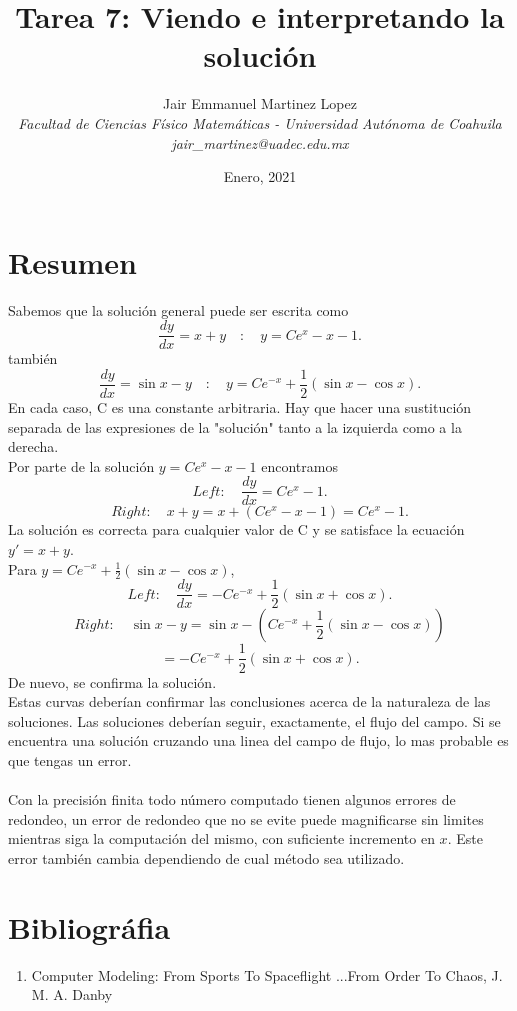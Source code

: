 \documentclass[12pt]{article}
\title{\vspace{-10mm}\fontsize{16pt}{10pt}\textbf{Tarea 7: Viendo e interpretando la solución}} %
\author{
	\normalsize Jair Emmanuel Martinez Lopez\\ %
	\textit{\normalsize Facultad de Ciencias Físico Matemáticas - Universidad Autónoma de Coahuila}\\ %
	\textit{\normalsize jair\_{}martinez@uadec.edu.mx} %
}
\date{\normalsize Enero, 2021} %
\begin{document}
\maketitle
\thispagestyle{fancy}
\section*{Resumen}
Sabemos que la solución general puede ser escrita como
$$
\dfrac{dy}{dx}=x+y \quad :\quad y=Ce^{x}-x-1.
$$
también 
$$
\dfrac{dy}{dx}=\sin{x-y}\quad :\quad y=Ce^{-x}+\frac{1}{2}(\sin{x}-\cos{x}).
$$
En cada caso, C es una constante arbitraria. Hay que hacer una sustitución separada de las expresiones de la "solución" tanto a la izquierda como a la derecha.\\
Por parte de la solución $y=Ce^{x}-x-1$ encontramos
$$
Left: \quad \dfrac{dy}{dx}=Ce^{x}-1.
$$
$$
Right: \quad x+y=x+(Ce^{x}-x-1)=Ce^{x}-1.
$$
La solución es correcta para cualquier valor de C y se satisface la ecuación $y'=x+y$.\\
Para $y = Ce^{-x}+\frac{1}{2}(\sin{x}-\cos{x})$,
$$
Left: \quad \dfrac{dy}{dx}=-Ce^{-x}+\frac{1}{2}(\sin{x}+\cos{x}).
$$
$$
Right: \quad \sin{x-y} = \sin{x}-\left(Ce^{-x}+\frac{1}{2}(\sin{x}-\cos{x})\right)
$$
$$
=-Ce^{-x}+\frac{1}{2}(\sin{x}+\cos{x}).
$$
De nuevo, se confirma la solución.\\
Estas curvas deberían confirmar las conclusiones acerca de la naturaleza de las soluciones. Las soluciones deberían seguir, exactamente, el flujo del campo. Si se encuentra una solución cruzando una linea del campo de flujo, lo mas probable es que tengas un error.\\
\\
Con la precisión finita todo número computado tienen algunos errores de redondeo, un error de redondeo que no se evite puede magnificarse sin limites mientras siga la computación del mismo, con suficiente incremento en $x$. Este error también cambia dependiendo de cual método sea utilizado.
\section*{Bibliográfia}
\begin{enumerate}
	\item Computer Modeling: From Sports To Spaceflight ...From Order To Chaos, J. M. A. Danby
\end{enumerate}
\end{document}
